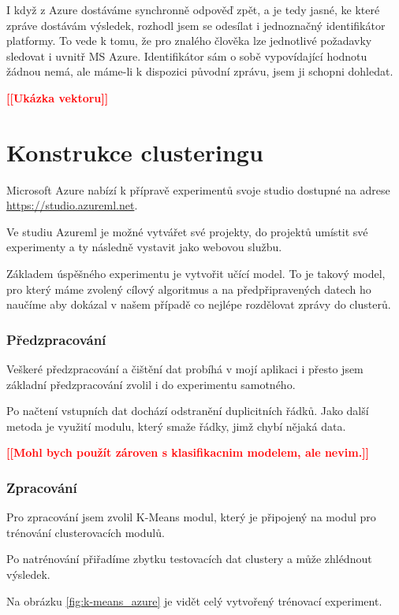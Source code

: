 \documentclass[thesis=M,czech]{FITthesis}[2012/10/20]
\newcommand{\todo}[1]{\textcolor{red}{\textbf{[[#1]]}}}
\begin{document}
		I když z Azure dostáváme synchronně odpověď zpět, a je tedy jasné, ke které zpráve dostávám výsledek, rozhodl jsem se odesílat i jednoznačný identifikátor platformy. To vede k tomu, že pro znalého člověka lze jednotlivé požadavky sledovat i uvnitř MS Azure. Identifikátor sám o sobě vypovídající hodnotu žádnou nemá, ale máme-li k dispozici původní zprávu, jsem ji schopni dohledat.
		
		\todo{Ukázka vektoru}
		
	\section{Konstrukce clusteringu}
		\label{sec:construc_clustering}
		Microsoft Azure nabízí k přípravě experimentů svoje studio dostupné na adrese \url{https://studio.azureml.net}.
		
		Ve studiu Azureml je možné vytvářet své projekty, do projektů umístit své experimenty a ty následně vystavit jako webovou službu.
		
		Základem úspěšného experimentu je vytvořit učící model. To je takový model, pro který máme zvolený cílový algoritmus a na předpřipravených datech ho naučíme aby dokázal v našem případě co nejlépe rozdělovat zprávy do clusterů.
		
		\subsubsection{Předzpracování}
		Veškeré předzpracování a čištění dat probíhá v mojí aplikaci i přesto jsem základní předzpracování zvolil i do experimentu samotného.
		
		Po načtení vstupních dat dochází odstranění duplicitních řádků. Jako další metoda je využití modulu, který smaže řádky, jimž chybí nějaká data.
		
		\todo{Mohl bych použít zároven s klasifikacnim modelem, ale nevim.}
		\subsubsection{Zpracování}
		Pro zpracování jsem zvolil K-Means modul, který je připojený na modul pro trénování clusterovacích modulů.
		
		Po natrénování přiřadíme zbytku testovacích dat clustery a může zhlédnout výsledek.
		
		Na obrázku \ref{fig:k-means_azure} je vidět celý vytvořený trénovací experiment.
		
\end{document}
